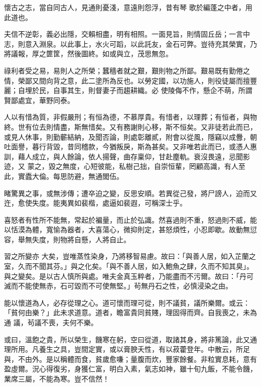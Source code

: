 \begin{pinyinscope}
 懷古之志，當自同古人，見通則憂淺，意遠則怨浮，昔有琴
 歌於編蓬之中者，用此道也。



 夫信不逆彰，義必出隱，交賴相盡，明有相照。一面見旨，則情固丘岳；一言中志，則意入淵泉。以此事上，水火可蹈，以此託友，金石可弊。豈待充其榮實，乃將議報，厚之篚筐，然後圖終。如或與立，茂思無忽。



 祿利者受之易，易則人之所榮；蠶穡者就之艱，艱則物之所鄙。艱易既有勤倦之情，榮鄙又間向背之意，此二塗所為反也。以勞定國，以功施人，則役徒屬而擅豐麗；自埋於民，自事其生，則督妻子而趨耕織。必
 使陵侮不作，懸企不萌，所謂賢鄙處宜，華野同泰。



 人以有惜為質，非假嚴刑；有恒為德，不慕厚貴。有惜者，以理葬；有恒者，與物終。世有位去則情盡，斯無惜矣。又有務謝則心移，斯不恒矣。又非徒若此而已，或見人休事，則勤蘄結納，及聞否論，則處彰離貳，附會以從風，隱竊以成釁，朝吐面譽，暮行背毀，昔同稽款，今猶叛戾，斯為甚矣。又非唯若此而已，或憑人惠訓，藉人成立，與人餘論，依人揚聲，曲存稟仰，甘赴塵軌。衰沒畏遠，忌聞影迹，又
 蒙之，毀之無度，心短彼能，私樹己拙，自崇恒輩，罔顧高識，有人至此，實蠹大倫。每思防避，無通閭伍。



 睹驚異之事，或無涉傳；遭卒迫之變，反思安順。若異從己發，將尸謗人，迫而又迕，愈使失度。能夷異如裴楷，處逼如裴遐，可稱深士乎。



 喜怒者有性所不能無，常起於褊量，而止於弘識。然喜過則不重，怒過則不威，能以恬漠為體，寬愉為器者，大喜蕩心，微抑則定，甚怒煩性，小忍即歇。故動無愆容，舉無失度，則物將自懸，人將自止。



 習之所變亦
 大矣，豈唯蒸性染身，乃將移智易慮。故曰：「與善人居，如入芷蘭之室，久而不聞其芬。」與之化矣。「與不善人居，如入鮑魚之肆，久而不知其臭」。與之變矣。是以古人慎所與處。唯夫金真玉粹者，乃能盡而不污爾。故曰：「丹可滅而不能使無赤，石可毀而不可使無堅。」茍無丹石之性，必慎浸染之由。



 能以懷道為人，必存從理之心。道可懷而理可從，則不議貧，議所樂爾。或云：「貧何由樂？」此未求道意。道者，瞻富貴同貧賤，理固得而齊。自我喪之，未為通
 議，茍議不喪，夫何不樂。



 或曰，溫飽之貴，所以榮生，饑寒在躬，空曰從道，取諸其身，將非篤論，此又通理所用。凡養生之具，豈間定實，或以膏腴夭性，有以菽藿登年。中散云，所足與，不由外。是以稱體而食，貧歲愈嗛；量腹而炊，豐家餘餐。非粒實息耗，意有盈虛爾。況心得復劣，身獲仁富，明白入素，氣志如神，雖十旬九飯，不能令饑，業席三屬，不能為寒。豈不信然！




\end{pinyinscope}
